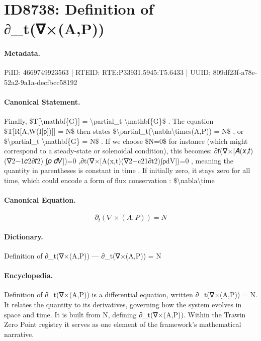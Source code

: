 \section*{ID8738: Definition of ∂\_t(∇×(A,P))}
\paragraph{Metadata.}
PiID: 4669749923563 | RTEID: RTE:P33931.5945:T5.6433 | UUID: 809df23f-a78e-52a2-9a1a-decfbcc58192

\paragraph{Canonical Statement.}
Finally, \$T[\textbackslash{}mathbf\{G\}] = \textbackslash{}partial\_t \textbackslash{}mathbf\{G\}\$ . The equation \$T[R[A,W(I[ρ])]] = N\$ then states \$\textbackslash{}partial\_t(\textbackslash{}nabla\textbackslash{}times(A,P)) = N\$ , or \$\textbackslash{}partial\_t \textbackslash{}mathbf\{G\} = N\$ . If we choose \$N=0\$ for instance (which might correspond to a steady-state or solenoidal condition), this becomes: ∂𝑡(∇×[𝐴(𝑥,𝑡) (∇2−1𝑐2∂𝑡2) ⁣∫𝜌 𝑑𝑉])=0 ,∂t​(∇×[A(x,t)(∇2−c21​∂t2​)∫ρdV])=0 , meaning the quantity in parentheses is constant in time . If initially zero, it stays zero for all time, which could encode a form of flux conservation : \$\textbackslash{}nabla\textbackslash{}time

\paragraph{Canonical Equation.}
\[
\partial_t(\nabla\times(A,P)) = N
\]

\paragraph{Dictionary.}
Definition of ∂\_t(∇×(A,P)) — ∂\_t(∇×(A,P)) = N

\paragraph{Encyclopedia.}
Definition of ∂\_t(∇×(A,P)) is a differential equation, written ∂\_t(∇×(A,P)) = N. It relates the quantity to its derivatives, governing how the system evolves in space and time. It is built from N, defining ∂\_t(∇×(A,P)). Within the Trawin Zero Point registry it serves as one element of the framework's mathematical narrative.
